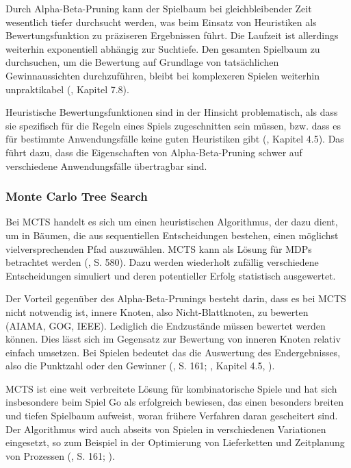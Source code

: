 Durch Alpha-Beta-Pruning kann der Spielbaum bei gleichbleibender Zeit wesentlich tiefer durchsucht werden, was beim Einsatz von Heuristiken als Bewertungsfunktion zu präziseren Ergebnissen führt. Die Laufzeit ist allerdings weiterhin exponentiell abhängig zur Suchtiefe. Den gesamten Spielbaum zu durchsuchen, um die Bewertung auf Grundlage von tatsächlichen Gewinnaussichten durchzuführen, bleibt bei komplexeren Spielen weiterhin unpraktikabel (\cite{Heineman.October2008}, Kapitel 7.8).

Heuristische Bewertungsfunktionen sind in der Hinsicht problematisch, als dass sie spezifisch für die Regeln eines Spiels zugeschnitten sein müssen, bzw. dass es für bestimmte Anwendungsfälle keine guten Heuristiken gibt (\cite{Ferguson.January2019}, Kapitel 4.5). Das führt dazu, dass die Eigenschaften von Alpha-Beta-Pruning schwer auf verschiedene Anwendungsfälle übertragbar sind.

\subsubsection{Monte Carlo Tree Search}

Bei MCTS handelt es sich um einen heuristischen Algorithmus, der dazu dient, um in Bäumen, die aus sequentiellen Entscheidungen bestehen, einen möglichst vielversprechenden Pfad auszuwählen. MCTS kann als Lösung für MDPs betrachtet werden (\cite{Russell.2020}, S. 580). Dazu werden wiederholt zufällig verschiedene Entscheidungen simuliert und deren potentieller Erfolg statistisch ausgewertet.

Der Vorteil gegenüber des Alpha-Beta-Prunings besteht darin, dass es bei MCTS nicht notwendig ist, innere Knoten, also Nicht-Blattknoten, zu bewerten (AIAMA, GOG, IEEE). Lediglich die Endzustände müssen bewertet werden können. Dies lässt sich im Gegensatz zur Bewertung von inneren Knoten relativ einfach umsetzen. Bei Spielen bedeutet das die Auswertung des Endergebnisses, also die Punktzahl oder den Gewinner (\cite{Russell.2020}, S. 161; \cite{Ferguson.January2019}, Kapitel 4.5, \cite{Browne.2012}).

MCTS ist eine weit verbreitete Lösung für kombinatorische Spiele und hat sich insbesondere beim Spiel Go als erfolgreich bewiesen, das einen besonders breiten und tiefen Spielbaum aufweist, woran frühere Verfahren daran gescheitert sind. Der Algorithmus wird auch abseits von Spielen in verschiedenen Variationen eingesetzt, so zum Beispiel in der Optimierung von Lieferketten und Zeitplanung von Prozessen (\cite{Russell.2020}, S. 161; \cite{Browne.2012}).

